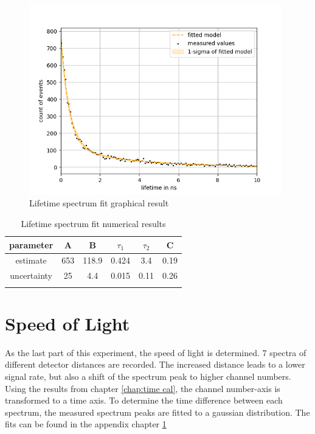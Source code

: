\begin{figure}[]
    \centering
    \includegraphics[width=110mm,scale=0.5]{Positronium/include/lifetimefit.png}
    \caption{Lifetime spectrum fit graphical result} 
    \label{fig:lifetime}
\end{figure}

\begin{table}[H]
    \centering
    \caption{Lifetime spectrum fit numerical results}
    \begin{tabular}{cccccc}
         parameter & A& B & $\tau_1$ & $\tau_2$ & C\\ \hline
         estimate & 653 & 118.9 & 0.424 & 3.4 & 0.19\\
         uncertainty & 25 & 4.4& 0.015& 0.11& 0.26 \\\hline \\
    \end{tabular}
    \label{tab:lifetime }
\end{table}

\section{Speed of Light}
As the last part of this experiment, the speed of light is determined. 7 spectra of different detector distances are recorded. The increased distance leads to a lower signal rate, but also a shift of the spectrum peak to higher channel numbers. Using the results from chapter \ref{chap:time cal}, the channel number-axis is transformed to a time axis. To determine the time difference between each spectrum, the measured spectrum peaks are fitted to a gaussian distribution. The fits can be found in the appendix chapter \ref{}